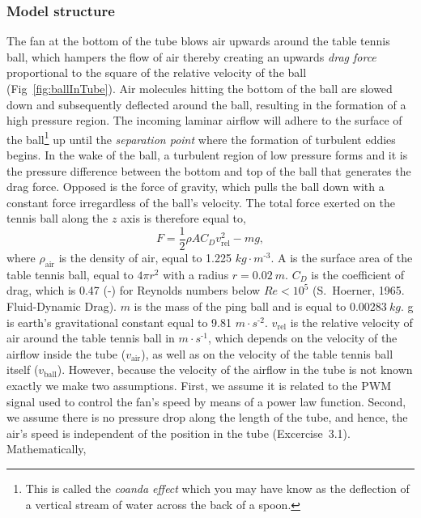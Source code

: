 \documentclass[10pt,twoside,openright]{article}
\begin{document}
\subsubsection{Model structure}\label{section:model_structure}
The fan at the bottom of the tube blows air upwards around the table tennis ball, which hampers the flow of air thereby creating an upwards \textit{drag force} proportional to the square of the relative velocity of the ball (Fig~\ref{fig:ballInTube}). Air molecules hitting the bottom of the ball are slowed down and subsequently deflected around the ball, resulting in the formation of a high pressure region. The incoming laminar airflow will adhere to the surface of the ball\footnote{This is called the \textit{coanda effect} which you may have know as the deflection of a vertical stream of water across the back of a spoon.} up until the \textit{separation point} where the formation of turbulent eddies begins. In the wake of the ball, a turbulent region of low pressure forms and it is the pressure difference between the bottom and top of the ball that generates the drag force. Opposed is the force of gravity, which pulls the ball down with a constant force irregardless of the ball's velocity. The total force exerted on the tennis ball along the $z$ axis is therefore equal to,
\begin{equation}\label{eq:pingPongForce}
F = \frac{1}{2} \rho A C_D v_{\text{rel}}^2 - mg,
\end{equation}
where $\rho_{\text{air}}$ is the density of air, equal to 1.225 $kg \cdot m^{\text{-}3}$. A is the surface area of the table tennis ball, equal to $4\pi r^2$ with a radius $r=0.02~m$. $C_D$ is the coefficient of drag, which is 0.47 (-) for Reynolds numbers below $Re<10^5$ (S.~Hoerner, 1965. Fluid-Dynamic Drag). $m$ is the mass of the ping ball and is equal to $0.00283~kg$. g is earth's gravitational constant equal to 9.81 $m \cdot s^{\text{-}2}$. $v_{\text{rel}}$ is the relative velocity of air around the table tennis ball in $m \cdot s^{\text{-}1}$, which depends on the velocity of the airflow inside the tube ($v_{\text{air}}$), as well as on the velocity of the table tennis ball itself ($v_{\text{ball}}$). However, because the velocity of the airflow in the tube is not known exactly we make two assumptions. First, we assume it is related to the PWM signal used to control the fan's speed by means of a power law function. Second, we assume there is no pressure drop along the length of the tube, and hence, the air's speed is independent of the position in the tube (Excercise~3.1). Mathematically,
\end{document}
